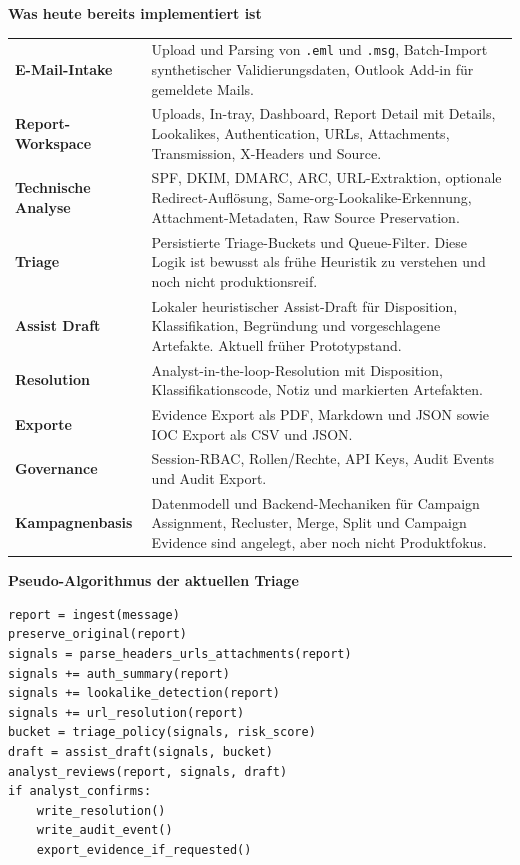 \documentclass[10pt,a4paper]{article}
\begin{document}
\vspace{0.35em}
\noindent\textbf{Was heute bereits implementiert ist}\par\vspace{0.12em}
\noindent\begin{tabularx}{\textwidth}{@{}>{\bfseries}p{4.1cm}X@{}}
E-Mail-Intake & Upload und Parsing von \texttt{.eml} und \texttt{.msg}, Batch-Import synthetischer Validierungsdaten, Outlook Add-in für gemeldete Mails.\\
Report-Workspace & Uploads, In-tray, Dashboard, Report Detail mit Details, Lookalikes, Authentication, URLs, Attachments, Transmission, X-Headers und Source.\\
Technische Analyse & SPF, DKIM, DMARC, ARC, URL-Extraktion, optionale Redirect-Auflösung, Same-org-Lookalike-Erkennung, Attachment-Metadaten, Raw Source Preservation.\\
Triage & Persistierte Triage-Buckets und Queue-Filter. Diese Logik ist bewusst als frühe Heuristik zu verstehen und noch nicht produktionsreif.\\
Assist Draft & Lokaler heuristischer Assist-Draft für Disposition, Klassifikation, Begründung und vorgeschlagene Artefakte. Aktuell früher Prototypstand.\\
Resolution & Analyst-in-the-loop-Resolution mit Disposition, Klassifikationscode, Notiz und markierten Artefakten.\\
Exporte & Evidence Export als PDF, Markdown und JSON sowie IOC Export als CSV und JSON.\\
Governance & Session-RBAC, Rollen/Rechte, API Keys, Audit Events und Audit Export.\\
Kampagnenbasis & Datenmodell und Backend-Mechaniken für Campaign Assignment, Recluster, Merge, Split und Campaign Evidence sind angelegt, aber noch nicht Produktfokus.\\
\end{tabularx}

\vspace{0.35em}
\noindent\textbf{Pseudo-Algorithmus der aktuellen Triage}
\begin{verbatim}
report = ingest(message)
preserve_original(report)
signals = parse_headers_urls_attachments(report)
signals += auth_summary(report)
signals += lookalike_detection(report)
signals += url_resolution(report)
bucket = triage_policy(signals, risk_score)
draft = assist_draft(signals, bucket)
analyst_reviews(report, signals, draft)
if analyst_confirms:
    write_resolution()
    write_audit_event()
    export_evidence_if_requested()
\end{verbatim}
\end{document}
